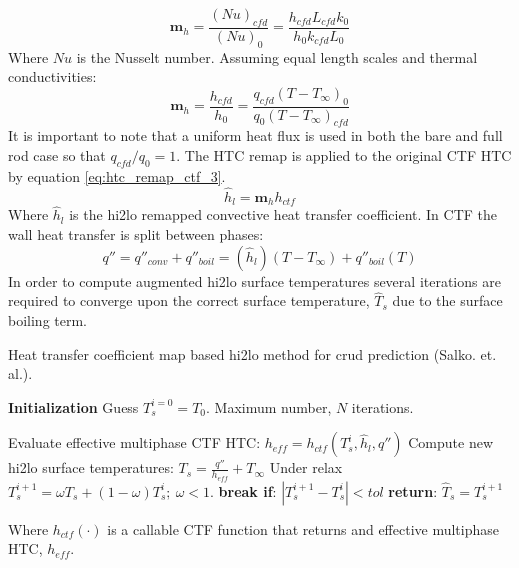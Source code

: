     \begin{equation}
        \mathbf m_h = \frac{(Nu)_{cfd}}{(Nu)_{0}} = \frac{h_{cfd} L_{cfd} k_{0} }{h_{0}k_{cfd} L_{0}}
         \label{eq:htc_remap_ctf_1}
    \end{equation}
    Where $Nu$ is the Nusselt number.  Assuming equal length scales and thermal conductivities:
    \begin{equation}
        \mathbf m_h = \frac{h_{cfd}}{h_{0}} = \frac{q_{cfd}(T-T_\infty)_{0}}{q_{0}(T-T_\infty)_{cfd}}
        \label{eq:htc_remap_ctf_2}
    \end{equation}
    It is important to note that a uniform heat flux is used in both the bare and full rod case so that $q_{cfd}/q_0 =1 $.
    The HTC remap is applied to the original CTF HTC by equation \ref{eq:htc_remap_ctf_3}.
    \begin{equation}
        \hat h_{l} = \mathbf m_h h_{ctf}
        \label{eq:htc_remap_ctf_3}
    \end{equation}
    Where $\hat h_l$ is the hi2lo remapped convective heat transfer coefficient.  In CTF the wall heat transfer is split between phases:
    \begin{equation}
        q'' = q''_{conv} + q''_{boil} = (\hat h_l)(T-T_{\infty}) + q''_{boil}(T)
    \end{equation}
    In order to compute augmented hi2lo surface temperatures
    several iterations are required to converge upon the correct surface temperature, $\hat T_s$ due to the surface boiling term.

    \begin{algorithm}[H]
        \caption{Heat transfer coefficient map based hi2lo method for crud prediction (Salko. et. al.).}
    \begin{algorithmic}[1]
    \STATE \textbf{Initialization} 
    \STATE Guess $T^{i=0}_s=T_0$.  Maximum number, $N$ iterations.

           \STATE Evaluate effective multiphase CTF HTC: $h_{eff} = h_{{ctf}}(T^i_{s}, \hat h_l, q'')$ \;
           \STATE Compute new hi2lo surface temperatures: $T_{s} = \frac{q''}{h_{eff}} + T_\infty$ \;
           \STATE  Under relax  $T^{i+1}_{s} = \omega T_{s} + (1 - \omega) T^{i}_{s} ;\ \omega < 1.$ \;
           \STATE  \textbf{break if}:  $|T^{i+1}_s - T^i_s| < tol$ \;
        \ENDFOR 
    \STATE \textbf{return}: $\hat T_s = T^{i+1}_s$
    \end{algorithmic}
    \end{algorithm}
    Where $h_{ctf}(\cdot)$ is a callable CTF function that returns and effective multiphase HTC, $h_{eff}$.

